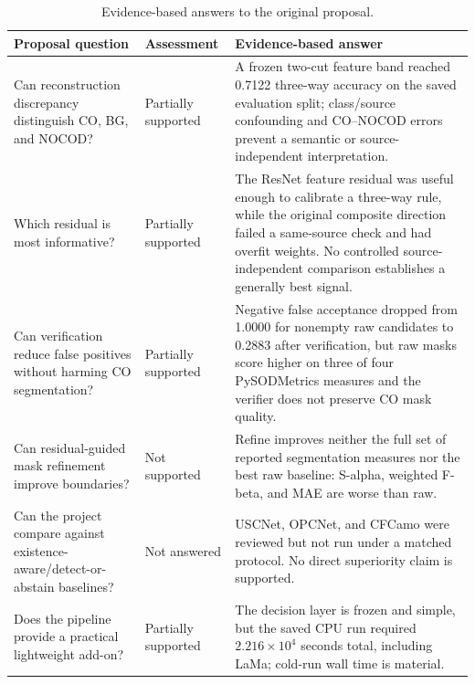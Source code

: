 \begin{table}[htbp]
\centering
\caption{Evidence-based answers to the original proposal.}
\label{tab:rqs}
\small
\begin{tabularx}{\textwidth}{L{3.6cm}L{2.2cm}Y}
\toprule
\textbf{Proposal question} & \textbf{Assessment} & \textbf{Evidence-based answer} \\
\midrule
Can reconstruction discrepancy distinguish CO, BG, and NOCOD? & Partially supported & A frozen two-cut feature band reached 0.7122 three-way accuracy on the saved evaluation split; class/source confounding and CO--NOCOD errors prevent a semantic or source-independent interpretation. \\
Which residual is most informative? & Partially supported & The ResNet feature residual was useful enough to calibrate a three-way rule, while the original composite direction failed a same-source check and had overfit weights. No controlled source-independent comparison establishes a generally best signal. \\
Can verification reduce false positives without harming CO segmentation? & Partially supported & Negative false acceptance dropped from 1.0000 for nonempty raw candidates to 0.2883 after verification, but raw masks score higher on three of four PySODMetrics measures and the verifier does not preserve CO mask quality. \\
Can residual-guided mask refinement improve boundaries? & Not supported & Refine improves neither the full set of reported segmentation measures nor the best raw baseline: S-alpha, weighted F-beta, and MAE are worse than raw. \\
Can the project compare against existence-aware/detect-or-abstain baselines? & Not answered & USCNet, OPCNet, and CFCamo were reviewed but not run under a matched protocol. No direct superiority claim is supported. \\
Does the pipeline provide a practical lightweight add-on? & Partially supported & The decision layer is frozen and simple, but the saved CPU run required $2.216\times10^4$ seconds total, including LaMa; cold-run wall time is material. \\
\bottomrule
\end{tabularx}

\par{}
\end{table}
